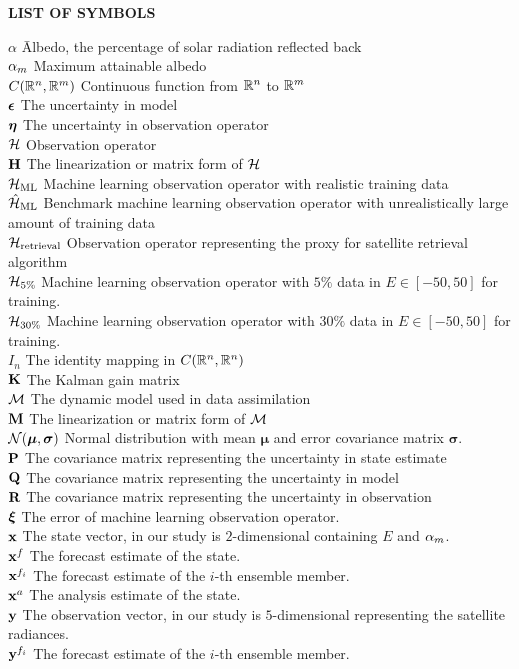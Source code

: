 {}

\begin{center}
{\Large \textbf{LIST OF SYMBOLS}}
\end{center}

\newcommand{\Sym}[2]{\noindent  #1 \> #2 \\}
\newcommand{\Symi}[2]{\noindent #1 \hspace{1.5cm} \= #2 \\}

\begin{tabbing}

\Symi{$\alpha$}{Albedo, the percentage of solar radiation reflected back}
\Sym{$\alpha_m$}{Maximum attainable albedo}
\Sym{$C(\mathbb{R}^n,\mathbb{R}^m)$}{Continuous function from $\mathbb{R}^n$ to $\mathbb{R}^m$}
\Sym{$\bm{\epsilon}$}{The uncertainty in model}
\Sym{$\bm{\eta}$}{The uncertainty in observation operator}
\Sym{$\mathcal{H}$}{Observation operator}
\Sym{$\textbf{H}$}{The linearization or matrix form of $\mathcal{H}$}
\Sym{$\mathcal{H}_{\text{ML}}$}{Machine learning observation operator with realistic training data}
\Sym{$\hat{\mathcal{H}}_{\text{ML}}$}{Benchmark machine learning observation operator with unrealistically large amount of training data}
\Sym{$\mathcal{H}_{\text{retrieval}}$}{Observation operator representing the proxy for satellite retrieval algorithm}
\Sym{$\mathcal{H}_{5\%}$}{Machine learning observation operator with $5\%$ data in $E\in[-50,50]$ for training.}
\Sym{$\mathcal{H}_{30\%}$}{Machine learning observation operator with $30\%$ data in $E\in[-50,50]$ for training.}
\Sym{$I_n$}{The identity mapping in $C(\mathbb{R}^n,\mathbb{R}^n)$}
\Sym{$\textbf{K}$}{The Kalman gain matrix}
\Sym{$\mathcal{M}$}{The dynamic model used in data assimilation}
\Sym{$\textbf{M}$}{The linearization or matrix form of $\mathcal{M}$}
\Sym{$\mathcal{N}(\bm{\mu},\bm{\sigma})$}{Normal distribution with mean $\bm{\mu}$ and error covariance matrix $\bm{\sigma}$.}
\Sym{$\textbf{P}$}{The covariance matrix representing the uncertainty in state estimate}
\Sym{$\textbf{Q}$}{The covariance matrix representing the uncertainty in model}
\Sym{$\textbf{R}$}{The covariance matrix representing the uncertainty in observation}
\Sym{$\bm{\xi}$}{The error of machine learning observation operator.}
\Sym{$\textbf{x}$}{The state vector, in our study is $2$-dimensional containing $E$ and $\alpha_m$.}
\Sym{$\textbf{x}^f$}{The forecast estimate of the state.}
\Sym{$\textbf{x}^{f_i}$}{The forecast estimate of the $i$-th ensemble member.}
\Sym{$\textbf{x}^a$}{The analysis estimate of the state.}
\Sym{$\textbf{y}$}{The observation vector, in our study is $5$-dimensional representing the satellite radiances.}
\Sym{$\textbf{y}^{f_i}$}{The forecast estimate of the $i$-th ensemble member.}


\end{tabbing}

\clearpage
